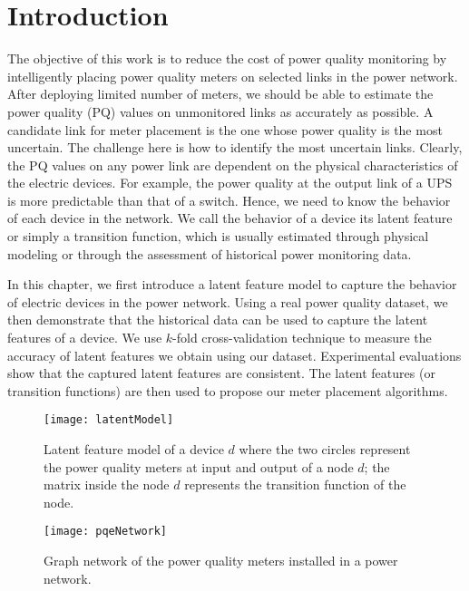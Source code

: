 \label{chap:latentF}
\section{Introduction}
The objective of this work is to reduce the cost of power quality monitoring by intelligently placing power quality meters on selected links in the power network. After deploying limited number of meters, we should be able to estimate the power quality (PQ) values on unmonitored links as accurately as possible. A candidate link for meter placement is the one whose power quality is the most uncertain. The challenge here is how to identify the most uncertain links. Clearly, the PQ values on any power link are dependent on the physical characteristics of the electric devices. For example, the power quality at the output link of a UPS is more predictable than that of a switch. Hence, we need to know the behavior of each device in the network. We call the behavior of a device its latent feature or simply a transition function, which is usually estimated through physical modeling or through the assessment of historical power monitoring data.

In this chapter, we first introduce a latent feature model to capture the behavior of electric devices in the power network. Using a real power quality dataset, we then demonstrate that the historical data can be used to capture the latent features of a device. We use $k$-fold cross-validation technique to measure the accuracy of latent features we obtain using our dataset. Experimental evaluations show that the captured latent features are consistent. The latent features (or transition functions) are then used to propose our meter placement algorithms.

\begin{figure}[!p]
\center
\texttt{[image: latentModel]}
\caption{Latent feature model of a device $d$ where the two circles represent the power quality meters at input and output of a node $d$; the matrix inside the node $d$ represents the transition function of the node.}
\label{fig:latentModel}

\end{figure}

\begin{figure}[!p]
\center
\texttt{[image: pqeNetwork]}
\caption{Graph network of the power quality meters installed in a power network.}
\label{fig:pqeNetwork}
\vspace{3cm}
\end{figure}

